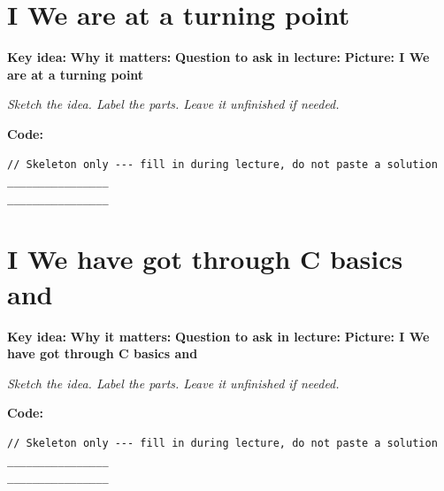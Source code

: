 \documentclass[14pt]{extarticle}
\newcommand{\deflabel}[1]{\noindent\textcolor{slotdef}{\textbf{#1}}}
\newcommand{\drawlabel}[1]{\noindent\textcolor{slotdraw}{\textbf{#1}}}
\begin{document}
\section{I We are at a turning point}
\Needspace{0.16\textheight}
\deflabel{Key idea:}
\vspace{1.1em}
\Needspace{0.16\textheight}
\deflabel{Why it matters:}
\vspace{1.1em}
\Needspace{0.16\textheight}
\deflabel{Question to ask in lecture:}
\vspace{1.1em}
\Needspace{0.28\textheight}
\drawlabel{Picture: I We are at a turning point}
{\color{slotdraw}
\begin{framed}
\color{ink}
\begin{minipage}[t][0.22\textheight]{\textwidth}
\vspace{0.4em}
\textit{Sketch the idea. Label the parts. Leave it unfinished if needed.}
\end{minipage}
\end{framed}
}
\vspace{1em}
\Needspace{0.18\textheight}
\drawlabel{Code:}
\begin{lstlisting}
// Skeleton only --- fill in during lecture, do not paste a solution
________________
________________
\end{lstlisting}
\vspace{1em}
\section{I We have got through C basics and}
\Needspace{0.16\textheight}
\deflabel{Key idea:}
\vspace{1.1em}
\Needspace{0.16\textheight}
\deflabel{Why it matters:}
\vspace{1.1em}
\Needspace{0.16\textheight}
\deflabel{Question to ask in lecture:}
\vspace{1.1em}
\Needspace{0.28\textheight}
\drawlabel{Picture: I We have got through C basics and}
{\color{slotdraw}
\begin{framed}
\color{ink}
\begin{minipage}[t][0.22\textheight]{\textwidth}
\vspace{0.4em}
\textit{Sketch the idea. Label the parts. Leave it unfinished if needed.}
\end{minipage}
\end{framed}
}
\vspace{1em}
\Needspace{0.18\textheight}
\drawlabel{Code:}
\begin{lstlisting}
// Skeleton only --- fill in during lecture, do not paste a solution
________________
________________
\end{lstlisting}
\vspace{1em}
\end{document}
